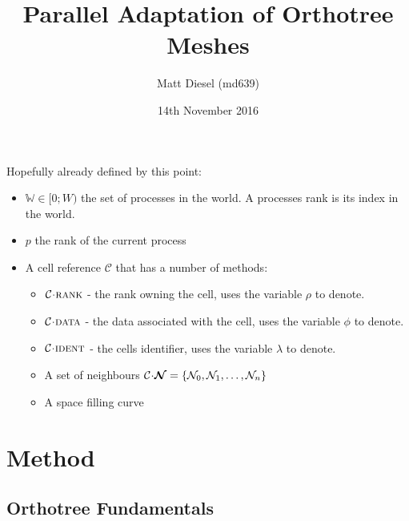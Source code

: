 \documentclass{IIBproject}
\newcommand{\vect}[1]{\bm{#1}}
\newcommand{\acc}{{\mkern 0.5mu\cdot\mkern 0.5mu}}
\begin{document}
\date{14th November 2016}
\author{Matt Diesel (md639)}
\title{Parallel Adaptation of Orthotree Meshes}






Hopefully already defined by this point:

\begin{itemize}
	\item $\mathbb{W} \in [0;W)$ the set of processes in the world. A processes rank is its index in the world.
	\item $p$ the rank of the current process
	\item A cell reference $\mathcal{C}$ that has a number of methods:
	\begin{itemize}
		\item $\mathcal{C}\acc\textproc{rank}$ - the rank owning the cell, uses the variable $\rho$ to denote.
		\item $\mathcal{C}\acc\textproc{data}$ - the data associated with the cell, uses the variable $\phi$ to denote.
		\item $\mathcal{C}\acc\textproc{ident}$ - the cells identifier, uses the variable $\lambda$ to denote. 
		\item A set of neighbours $\mathcal{C}\acc\vect{\mathcal{N}} = \{\mathcal{N}_0 , \mathcal{N}_1, \dots , \mathcal{N}_n\}$
		\item A space filling curve
	\end{itemize}
\end{itemize}


\section{Method}

\subsection{Orthotree Fundamentals}
\end{document}
